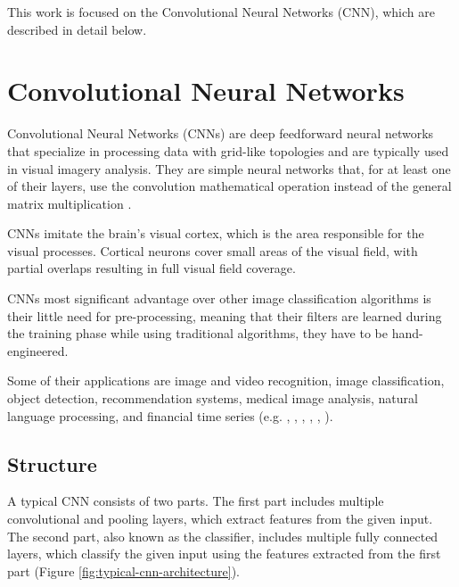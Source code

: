 This work is focused on the Convolutional Neural Networks (CNN), which are described in detail below.

\section{Convolutional Neural Networks}
Convolutional Neural Networks (CNNs) are deep feedforward neural networks that specialize in processing data with grid-like topologies and are typically used in visual imagery analysis. They are simple neural networks that, for at least one of their layers, use the convolution mathematical operation instead of the general matrix multiplication \cite{Goodfellow-et-al-2016}.

CNNs imitate the brain's visual cortex, which is the area responsible for the visual processes. Cortical neurons cover small areas of the visual field, with partial overlaps resulting in full visual field coverage.

CNNs most significant advantage over other image classification algorithms is their little need for pre-processing, meaning that their filters are learned during the training phase while using traditional algorithms, they have to be hand-engineered.

Some of their applications are image and video recognition, image classification, object detection, recommendation systems, medical image analysis, natural language processing, and financial time series \cite{Convolutional-neural-networks-wikipedia} (e.g. \cite{Going-Deeper-with-Convolutions}, \cite{Multi-column-Deep-Neural-Networks-for-Image-Classification}, \cite{Face-Recognition-A-Convolutional-Neural-Network-Approach}, \cite{Subject-independent-facial-expression-recognition-with-robust-face-detection-using-a-convolutional-neural-network}, \cite{Learning-Semantic-Representations-Using-Convolutional-Neural-Networks-for-Web-Search-Microsoft-Research}, \cite{A-Unified-Architecture-for-Natural-Language-Processing-Deep-Neural-Networks-with-Multitask-Learning}).

\subsection{Structure}
A typical CNN consists of two parts. The first part includes multiple convolutional and pooling layers, which extract features from the given input. The second part, also known as the classifier, includes multiple fully connected layers, which classify the given input using the features extracted from the first part (Figure \ref{fig:typical-cnn-architecture}).

